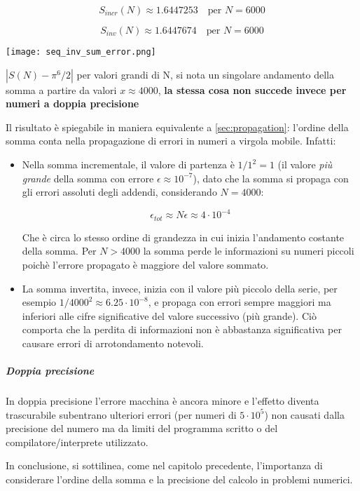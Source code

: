 $$
	S_{incr}(N) \approx \mathtt{1.6447253} \quad \text{per } N = 6000
$$

$$
	S_{inv}(N) \approx \mathtt{1.6447674} \quad \text{per } N = 6000
$$

\begin{marginfigure}%
    \hspace*{-2cm}
	\texttt{[image: seq\_inv\_sum\_error.png]}
	\caption{$|S(N) - \pi^6 / 2|$ per valori grandi di N, si nota un singolare
		andamento della somma a partire da valori $ x \approx 4000$, \textbf{la
			stessa cosa non succede invece per numeri a doppia precisione}}
\end{marginfigure}

Il risultato è spiegabile in maniera equivalente a \ref{sec:propagation}: l'ordine
della somma conta nella propagazione di errori in numeri a virgola mobile. Infatti:
\begin{itemize}
	\item Nella somma incrementale, il valore di partenza è $1/1^2 = 1$ (il valore
	      \textit{più grande} della somma con errore $\epsilon \approx 10^{-7}$),
	      dato che la somma si propaga con gli errori assoluti degli addendi,
	      considerando $N = 4000$:

	      $$\epsilon_{tot} \approx N \epsilon \approx 4 \cdot 10^{-4}$$

	      Che è circa lo stesso ordine di grandezza in cui inizia l'andamento costante
	      della somma. Per $N > 4000$ la somma perde le informazioni su numeri piccoli
	      poichè l'errore propagato è maggiore del valore sommato.

	\item La somma invertita, invece, inizia con il valore più piccolo della serie,
	      per esempio $1/4000^2 \approx 6.25 \cdot 10^{-8}$, e propaga con errori sempre maggiori
	      ma inferiori alle cifre significative del valore successivo (più grande).
	      Ciò comporta che la perdita di informazioni non è abbastanza significativa
	      per causare errori di arrotondamento notevoli.
\end{itemize}
\subparagraph{Doppia precisione}


In doppia precisione l'errore macchina è ancora minore e l'effetto diventa trascurabile
subentrano ulteriori errori (per numeri di $5 \cdot 10^5$) non causati dalla precisione del numero ma da limiti 
del programma scritto o del compilatore/interprete utilizzato.

In conclusione, si sottilinea, come nel capitolo precedente, l'importanza di considerare
l'ordine della somma e la precisione del calcolo in problemi numerici.









